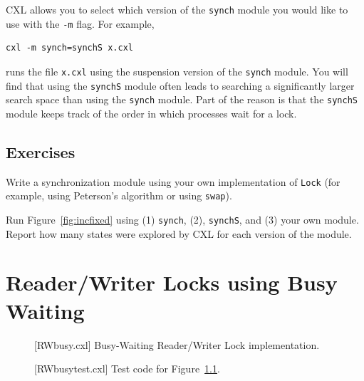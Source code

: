 \documentclass{report}
\newenvironment{code}{
\tcolorbox
}{
\endtcolorbox
}
\begin{document}
CXL allows you to select which version of the \texttt{synch} module you would
like to use with the \texttt{-m} flag.
For example,

\begin{code}
\begin{verbatim}
cxl -m synch=synchS x.cxl
\end{verbatim}
\end{code}

runs the file \texttt{x.cxl} using the suspension version of the \texttt{synch} module.
You will find that using the \texttt{synchS} module often leads to searching a
significantly larger search space than using the \texttt{synch} module.
Part of the reason is that the \texttt{synchS} module keeps track of the order
in which processes wait for a lock.

\section*{Exercises}
\begin{problems}
\item Write a synchronization module using your own implementation of \texttt{Lock}
(for example, using Peterson's algorithm or using \texttt{swap}).
\item
Run Figure~\ref{fig:incfixed} using (1) \texttt{synch}, (2), \texttt{synchS},
and (3) your own module.  Report how many states were explored by CXL for each
version of the module.
\end{problems}

\chapter{Reader/Writer Locks using Busy Waiting}
\label{ch:rdwrbusy}

\begin{figure}
\begin{code}
\end{code}
\caption{[RWbusy.cxl] Busy-Waiting Reader/Writer Lock implementation.}
\label{fig:rwbusy}
\end{figure}

\begin{figure}
\begin{code}
\end{code}
\caption{[RWbusytest.cxl] Test code for Figure~\ref{fig:rwbusy}.}
\label{fig:rwbusytest}
\end{figure}
\end{document}
